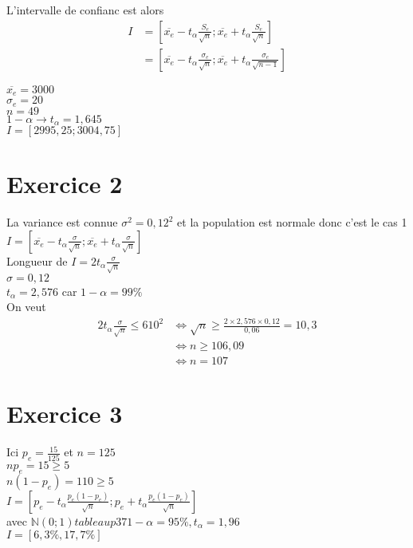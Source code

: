 \documentclass[12pt]{report}
\begin{document}
L'intervalle de confianc est alors 
\begin{align*}
    I &= [\overline{x_e} - t_\alpha \frac{S_e}{\sqrt{n}}; \overline{x_e} + t_\alpha \frac{S_e}{\sqrt{n}}]\\
    &= [\overline{x_e} - t_\alpha \frac{\sigma_e}{\sqrt{n}}; \overline{x_e} + t_\alpha \frac{\sigma_e}{\sqrt{n-1}}]
\end{align*}

$\overline{x_e} = 3000$\\
$\sigma_e = 20$\\
$n = 49$\\
$1-\alpha \to t_\alpha = 1,645$\\
$I = [2995,25;3004,75]$

\section{Exercice 2}
La variance est connue $\sigma^2 = 0,12^2$ et la population est normale  donc c'est le cas 1\\
$I= [\overline{x_e} - t_\alpha \frac{\sigma}{\sqrt{n}}; \overline{x_e} + t_\alpha \frac{\sigma}{\sqrt{n}}]$\\
Longueur de $I = 2 t_\alpha \frac{\sigma}{\sqrt{n}}$\\
$\sigma = 0,12$\\
$t_\alpha = 2,576$ car $1-\alpha = 99 \%$\\
On veut 
\begin{align*}
    2 t_\alpha \frac{\sigma}{\sqrt{n}} \leq 6 10^2 &\Leftrightarrow \sqrt{n} \geq \frac{2 \times 2,576 \times 0,12}{0,06} = 10,3\\
    &\Leftrightarrow n \geq 106,09\\
    &\Leftrightarrow n = 107
\end{align*}

\section{Exercice 3}
Ici $p_e = \frac{15}{125}$ et $n = 125$\\
$np_e=15 \geq 5$\\
$n(1-p_e) = 110 \geq 5$\\
$I= [p_e - t_\alpha \frac{p_e(1-p_e)}{\sqrt{n}}; p_e + t_\alpha \frac{p_e(1-p_e)}{\sqrt{n}}]$\\
avec $\mathbb{N}(0;1) tableau p37 1-\alpha = 95 \%, t_\alpha = 1,96$\\
$I=[6,3\%,17,7\%]$\\
\end{document}
